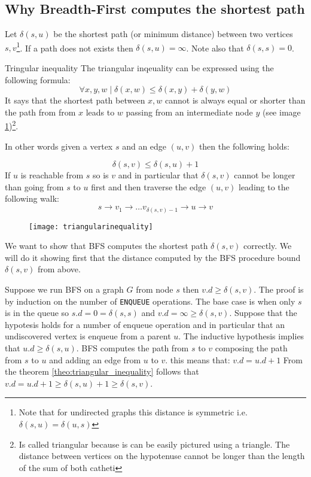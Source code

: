 \subsection{Why Breadth-First computes the shortest path}
Let $\delta(s,u)$ be the shortest path (or minimum distance) between two vertices $s,v$\footnote{Note that for undirected graphs this distance is symmetric i.e. $\delta(s,u) = \delta(u,s)$}. If a path does not exists then $\delta(s,u) = \infty$. Note also that $\delta(s,s) = 0$. 
\begin{theorem}{Tringular inequality}
\label{theo:triangular_inequality}
The triangular inqeuality can be expressed using the following formula:
\[
\forall x,y,w \; |\; \delta(x,w) \leq   \delta(x,y) + \delta(y,w)
\]
It says that the shortest path between $x,w$ cannot is always equal or shorter than the path from from $x$ leads to $w$ passing from an intermediate node $y$ (see image \ref{fig:triangularinequality})\footnote{Is called triangular because is can be easily pictured using a triangle. The distance between vertices on the hypotenuse cannot be longer than the length  of the sum of both catheti}.

In other words given a vertex $s$ and an edge $(u,v)$ then the following holds:

\[
\delta(s,v) \leq \delta(s,u) + 1
\]
If $u$ is reachable from $s$ so is $v$ and in particular that $\delta(s,v)$ cannot be longer than going from $s$ to $u$ first and then traverse the edge $(u,v)$ leading to the following walk: 
\[s \rightarrow v_1  \rightarrow  \ldots  v_{\delta(s,v)-1}  \rightarrow u  \rightarrow  v\]
\end{theorem}

	\begin{figure}
	\label{fig:triangularinequality}
	\centering
		\texttt{[image: triangularinequality]}
	\end{figure}

We want to show that BFS computes the shortest path $\delta(s,v)$ correctly. We will do it showing first that the distance computed by the BFS procedure bound $\delta(s,v)$ from above.

\begin{theorem}
Suppose we run BFS on a graph $G$ from node $s$ then $v.d \geq \delta(s,v)$. The proof is by induction on the number of \texttt{ENQUEUE} operations. The base case is when only $s$ is in the queue so 
$s.d = 0  = \delta(s,s)$ and $v.d = \infty \geq \delta(s,v)$. Suppose that the hypotesis holds for a number of enqueue operation and in particular that an undiscovered vertex is enqueue from a parent $u$. The inductive hypothesis implies that $u.d \geq \delta(s,u)$. BFS computes the path from $s$ to $v$ composing the path from $s$ to $u$ and adding an edge from $u$ to $v$. this means that: $v.d = u.d +1$
From the theorem \ref{theo:triangular_inequality} follows that $v.d = u.d +1 \geq \delta(s,u) +1 \geq \delta(s,v)$.
\end{theorem}

